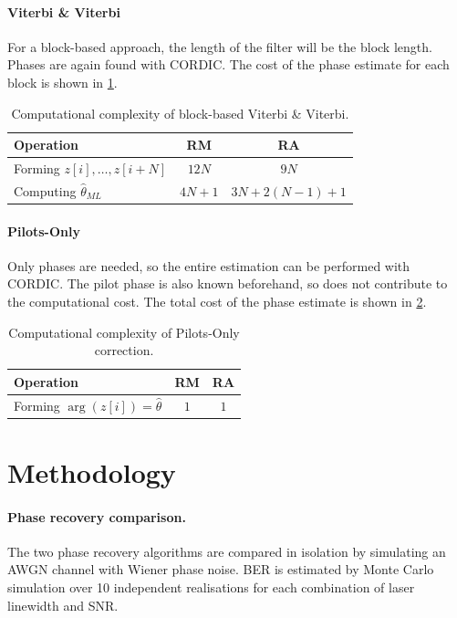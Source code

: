 \documentclass[12pt,a4paper]{report}
\begin{document}
\paragraph{Viterbi \& Viterbi}
For a block-based approach, the length of the filter will be the block length. Phases are again found with CORDIC. The cost of the phase estimate for each block is shown in \cref{tab:viterbi_cost}.
\begin{table}[H]
    \centering
    \begin{tabular}{lcc}
        \toprule
        Operation & RM & RA \\
        \midrule
        Forming \(z[i], \dots, z[i+N]\) & \(12N\) & \(9N\)\\
        Computing \(\hat{\theta}_{ML}\) & \(4N+1\) & \(3N+2(N-1)+1\)\\
        \bottomrule
    \end{tabular}
    \caption{Computational complexity of block-based Viterbi \& Viterbi.}
    \label{tab:viterbi_cost}
\end{table}
\paragraph{Pilots-Only}
Only phases are needed, so the entire estimation can be performed with CORDIC. The pilot phase is also known beforehand, so does not contribute to the computational cost. The total cost of the phase estimate is shown in \cref{tab:pilot_cost}.
\begin{table}[H]
    \centering
    \begin{tabular}{lcc}
        \toprule
        Operation & RM & RA \\
        \midrule
        Forming \(\arg(z[i]) = \hat{\theta}\) & \(1\) & \(1\)\\
        \bottomrule
    \end{tabular}
    \caption{Computational complexity of Pilots-Only correction.}
    \label{tab:pilot_cost}
\end{table}

\section{Methodology}

\paragraph{Phase recovery comparison.} The two phase recovery algorithms are compared in isolation by simulating an AWGN channel with Wiener phase noise. BER is estimated by Monte Carlo simulation over 10 independent realisations for each combination of laser linewidth and SNR.
\end{document}

